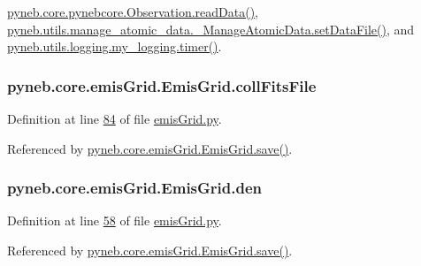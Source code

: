 \hyperlink{pynebcore_8py_source_l03589}{pyneb.\+core.\+pynebcore.\+Observation.\+read\+Data()}, \hyperlink{manage__atomic__data_8py_source_l00380}{pyneb.\+utils.\+manage\+\_\+atomic\+\_\+data.\+\_\+\+Manage\+Atomic\+Data.\+set\+Data\+File()}, and \hyperlink{logging_8py_source_l00115}{pyneb.\+utils.\+logging.\+my\+\_\+logging.\+timer()}.

\hypertarget{classpyneb_1_1core_1_1emis_grid_1_1_emis_grid_ad9f51a3439ea7455aaf790887fc78b3c}{}
\subsubsection[{coll\+Fits\+File}]{\setlength{\rightskip}{0pt plus 5cm}pyneb.\+core.\+emis\+Grid.\+Emis\+Grid.\+coll\+Fits\+File}\label{classpyneb_1_1core_1_1emis_grid_1_1_emis_grid_ad9f51a3439ea7455aaf790887fc78b3c}


Definition at line \hyperlink{emis_grid_8py_source_l00084}{84} of file \hyperlink{emis_grid_8py_source}{emis\+Grid.\+py}.



Referenced by \hyperlink{emis_grid_8py_source_l00096}{pyneb.\+core.\+emis\+Grid.\+Emis\+Grid.\+save()}.

\hypertarget{classpyneb_1_1core_1_1emis_grid_1_1_emis_grid_ac393173ea0ffbfdffb4c095fa6acada1}{}
\subsubsection[{den}]{\setlength{\rightskip}{0pt plus 5cm}pyneb.\+core.\+emis\+Grid.\+Emis\+Grid.\+den}\label{classpyneb_1_1core_1_1emis_grid_1_1_emis_grid_ac393173ea0ffbfdffb4c095fa6acada1}


Definition at line \hyperlink{emis_grid_8py_source_l00058}{58} of file \hyperlink{emis_grid_8py_source}{emis\+Grid.\+py}.



Referenced by \hyperlink{emis_grid_8py_source_l00096}{pyneb.\+core.\+emis\+Grid.\+Emis\+Grid.\+save()}.

\hypertarget{classpyneb_1_1core_1_1emis_grid_1_1_emis_grid_abd2b718af1e50d5c640e5fbb881c02f9}{}
